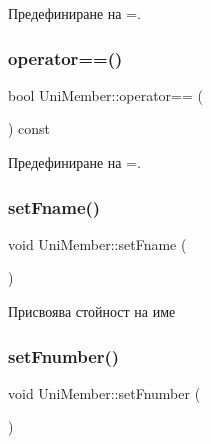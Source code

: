 Предефиниране на =. 

\mbox{\label{class_uni_member_abb98661e8d9950b55b3f647d0c9656f7}} 
\subsubsection{\texorpdfstring{operator==()}{operator==()}}
{\footnotesize\ttfamily bool Uni\+Member\+::operator== (\begin{DoxyParamCaption}\item[{const \hyperlink{class_uni_member}{Uni\+Member} \&}]{ }\end{DoxyParamCaption}) const}



Предефиниране на =. 

\mbox{\label{class_uni_member_afe68f8430ad033de7f87960946e29038}} 
\subsubsection{\texorpdfstring{set\+Fname()}{setFname()}}
{\footnotesize\ttfamily void Uni\+Member\+::set\+Fname (\begin{DoxyParamCaption}\item[{const std\+::string \&}]{ }\end{DoxyParamCaption})}



Присвоява стойност на име 

\mbox{\label{class_uni_member_ad979c7e5a0fe22e5928c8cc71964a8e2}} 
\subsubsection{\texorpdfstring{set\+Fnumber()}{setFnumber()}}
{\footnotesize\ttfamily void Uni\+Member\+::set\+Fnumber (\begin{DoxyParamCaption}\item[{int}]{ }\end{DoxyParamCaption})}



